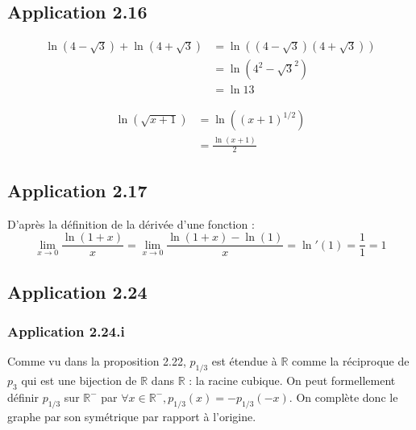 \documentclass[a4paper,10pt]{report}
\begin{document}
\subsection*{Application 2.16}

\begin{equation*}
	\begin{split}
		\ln(4-\sqrt{3}) + \ln(4+\sqrt{3})
		&= \ln ((4-\sqrt{3})(4+\sqrt{3}))\\
		&= \ln (4^2-\sqrt{3}^2) \\
		&= \ln 13
	\end{split}
\end{equation*}

\begin{equation*}
	\begin{split}
		\ln(\sqrt{x+1})
		&= 	\ln((x+1)^{1/2})\\
		&= \frac{\ln(x+1)}{2}
	\end{split}
\end{equation*}

\subsection*{Application 2.17}
D'après la définition de la dérivée d'une fonction :
\begin{displaymath}
\lim_{x \rightarrow 0} \frac{\ln(1+x)}{x} = \lim_{x \rightarrow 0} \frac{\ln(1+x) - \ln(1)}{x} = \ln'(1) = \frac{1}{1} = 1
\end{displaymath}


\subsection*{Application 2.24}

\subsubsection*{Application 2.24.i}


Comme vu dans la proposition 2.22, $p_{1/3}$ est étendue à $\mathbb{R}$ comme la réciproque de $p_3$ qui est une bijection
 de  $\mathbb{R}$ dans $\mathbb{R}$ : la racine cubique. On peut formellement définir $p_{1/3}$ sur $\mathbb{R}^-$ par $\forall x \in \mathbb{R}^-,
 p_{1/3}(x) = -p_{1/3}(-x)$. On complète donc le graphe par son symétrique par rapport à l'origine.
\end{document}
